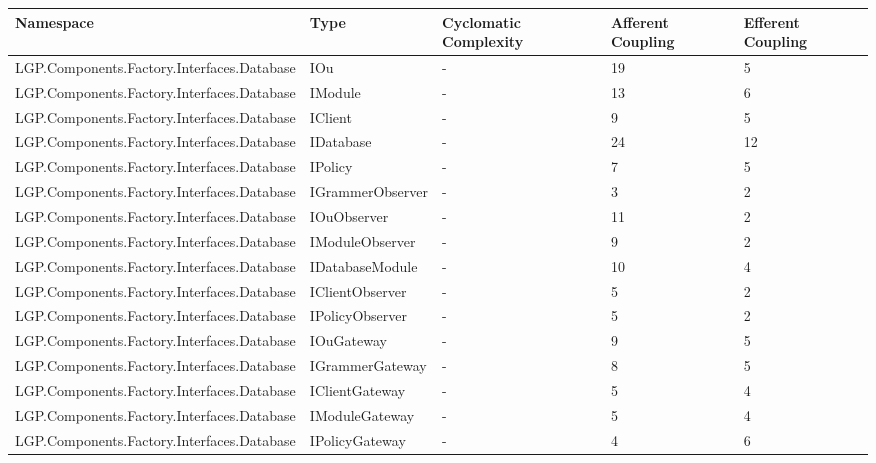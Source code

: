 		\newpage
			
			\begin{table}[h!t]
				\footnotesize{\begin{tabular}{ | p{82mm} | p{32mm} | p{10mm} | p{10mm} | p{10mm} | }
																						\hline
				Namespace & Type  & Cyclomatic Complexity & Afferent Coupling & Efferent Coupling  \\ \hline				
				LGP.Components.Factory.Interfaces.Database & IOu   & -     & \cellcolor{ored}19    & 5  \\ \hline
				LGP.Components.Factory.Interfaces.Database & IModule & -     & \cellcolor{ored}13    & 6  \\ \hline
				LGP.Components.Factory.Interfaces.Database & IClient & -     & \cellcolor{ored}9     & 5  \\ \hline
				LGP.Components.Factory.Interfaces.Database & IDatabase & -     & \cellcolor{ored}24    & 12  \\ \hline
				LGP.Components.Factory.Interfaces.Database & IPolicy & -     & 7     & 5  \\ \hline
				LGP.Components.Factory.Interfaces.Database & IGrammerObserver & -     & 3     & 2  \\ \hline
				LGP.Components.Factory.Interfaces.Database & IOuObserver & -     & \cellcolor{ored}11    & 2  \\ \hline
				LGP.Components.Factory.Interfaces.Database & IModuleObserver & -     & \cellcolor{ored}9     & 2  \\ \hline
				LGP.Components.Factory.Interfaces.Database & IDatabaseModule & -     & \cellcolor{ored}10    & 4  \\ \hline
				LGP.Components.Factory.Interfaces.Database & IClientObserver & -     & 5     & 2  \\ \hline
				LGP.Components.Factory.Interfaces.Database & IPolicyObserver & -     & 5     & 2  \\ \hline
				LGP.Components.Factory.Interfaces.Database & IOuGateway & -     & \cellcolor{ored}9     & 5  \\ \hline
				LGP.Components.Factory.Interfaces.Database & IGrammerGateway & -     & \cellcolor{ored}8     & 5  \\ \hline
				LGP.Components.Factory.Interfaces.Database & IClientGateway & -     & 5     & 4  \\ \hline
				LGP.Components.Factory.Interfaces.Database & IModuleGateway & -     & 5     & 4  \\ \hline
				LGP.Components.Factory.Interfaces.Database & IPolicyGateway & -     & 4     & 6  \\ \hline

\end{tabular}}
\end{table}
